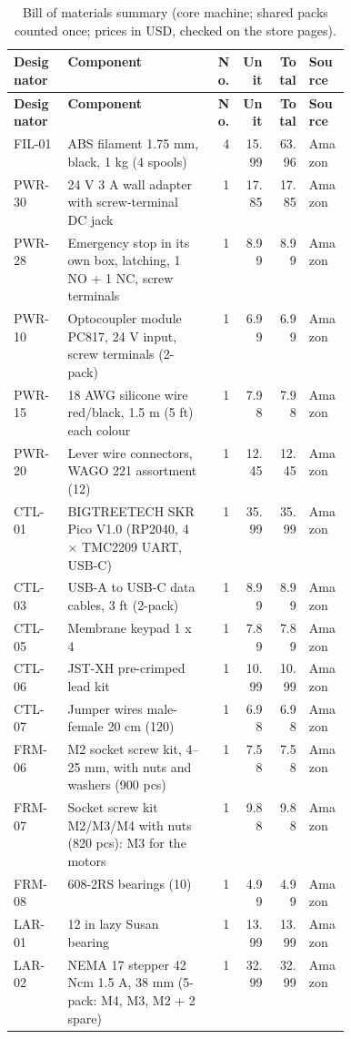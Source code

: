 {\small\begin{longtable}{|l|p{0.43\linewidth}|r|r|r|l|}\caption{Bill of materials summary (core machine; shared packs counted once; prices in USD, checked on the store pages).}\label{tab:bom}\\\hline
\textbf{Designator} & \textbf{Component} & \textbf{No.} & \textbf{Unit} & \textbf{Total} & \textbf{Source} \\ \hline\endfirsthead
\hline\textbf{Designator} & \textbf{Component} & \textbf{No.} & \textbf{Unit} & \textbf{Total} & \textbf{Source} \\ \hline\endhead
FIL-01 & ABS filament 1.75 mm, black, 1 kg (4 spools) & 4 & 15.99 & 63.96 & Amazon \\
PWR-30 & 24 V 3 A wall adapter with screw-terminal DC jack & 1 & 17.85 & 17.85 & Amazon \\
PWR-28 & Emergency stop in its own box, latching, 1 NO + 1 NC, screw terminals & 1 & 8.99 & 8.99 & Amazon \\
PWR-10 & Optocoupler module PC817, 24 V input, screw terminals (2-pack) & 1 & 6.99 & 6.99 & Amazon \\
PWR-15 & 18 AWG silicone wire red/black, 1.5 m (5 ft) each colour & 1 & 7.98 & 7.98 & Amazon \\
PWR-20 & Lever wire connectors, WAGO 221 assortment (12) & 1 & 12.45 & 12.45 & Amazon \\
CTL-01 & BIGTREETECH SKR Pico V1.0 (RP2040, 4 $\times$ TMC2209 UART, USB-C) & 1 & 35.99 & 35.99 & Amazon \\
CTL-03 & USB-A to USB-C data cables, 3 ft (2-pack) & 1 & 8.99 & 8.99 & Amazon \\
CTL-05 & Membrane keypad 1 x 4 & 1 & 7.89 & 7.89 & Amazon \\
CTL-06 & JST-XH pre-crimped lead kit & 1 & 10.99 & 10.99 & Amazon \\
CTL-07 & Jumper wires male-female 20 cm (120) & 1 & 6.98 & 6.98 & Amazon \\
FRM-06 & M2 socket screw kit, 4–25 mm, with nuts and washers (900 pcs) & 1 & 7.58 & 7.58 & Amazon \\
FRM-07 & Socket screw kit M2/M3/M4 with nuts (820 pcs): M3 for the motors & 1 & 9.88 & 9.88 & Amazon \\
FRM-08 & 608-2RS bearings (10) & 1 & 4.99 & 4.99 & Amazon \\
LAR-01 & 12 in lazy Susan bearing & 1 & 13.99 & 13.99 & Amazon \\
LAR-02 & NEMA 17 stepper 42 Ncm 1.5 A, 38 mm (5-pack: M4, M3, M2 + 2 spare) & 1 & 32.99 & 32.99 & Amazon \\

\end{longtable}}
